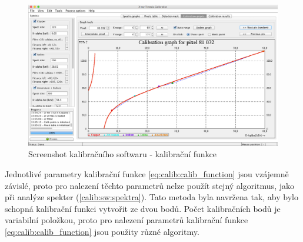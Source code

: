 \begin{figure}[t]
	\begin{center}
		\includegraphics[width=15cm]{figures/calibsw_cc.png}
		\caption{Screenshot kalibračního softwaru - kalibrační funkce}
		\label{fig:calib:sw_calib_function}
	\end{center}
\end{figure}

Jednotlivé parametry kalibrační funkce \ref{eq:calib:calib_function} jsou vzájemně závislé, proto pro nalezení těchto parametrů nelze použít stejný algoritmus, jako při analýze spekter (\ref{calib:sw:spektra}). Tato metoda byla navržena tak, aby bylo schopná kalibrační funkci vytvořit ze dvou bodů. Počet kalibračních bodů je variabilní položkou, proto pro nalezení parametrů kalibrační funkce \ref{eq:calib:calib_function} jsou použity různé algoritmy.

